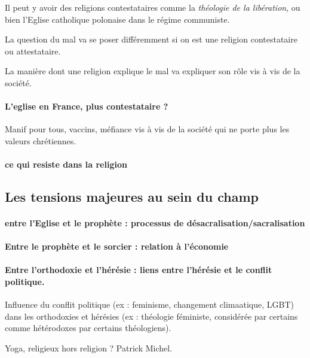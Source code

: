 \begin{Ex}
    Il peut y avoir des religions contestataires comme la \textit{théologie de la libération}, ou bien l'Eglise catholique polonaise dans le régime communiste. 
\end{Ex}

La question du mal va se poser différemment si on est une religion contestataire ou attestataire.
\begin{Ex}
    La manière dont une religion explique le mal va expliquer son rôle vis à vis de la société. 
\end{Ex}

\paragraph{L'eglise en France, plus contestataire ?} Manif pour tous, vaccins, méfiance vis à vis de la société qui ne porte plus les valeurs chrétiennes.


\paragraph{ce qui resiste dans la religion}
      
      
      \subsection{ Les tensions majeures au sein du champ }

      \paragraph{entre l’Eglise et le prophète : processus de désacralisation/sacralisation }
      \paragraph{Entre le prophète et le sorcier : relation à l’économie}
      \paragraph{ Entre l’orthodoxie et l’hérésie : liens entre l’hérésie et le conflit politique.  }  Influence du conflit politique (ex : feminisme, changement climaatique, LGBT) dans les orthodoxies et hérésies (ex : théologie féministe, considérée par certains comme hétérodoxes par certains théologiens).
          
      \begin{Ex}
          Yoga, religieux hors religion ? Patrick Michel.
      \end{Ex}
      
